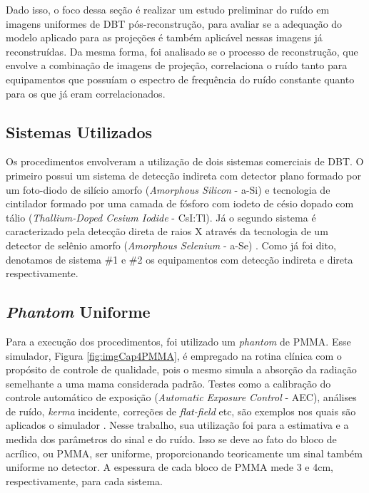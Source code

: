 Dado isso, o foco dessa seção é realizar um estudo preliminar do ruído em imagens uniformes de \acs{DBT} pós-reconstrução, para avaliar se a adequação do modelo aplicado para as projeções é também aplicável nessas imagens já reconstruídas. Da mesma forma, foi analisado se o processo de reconstrução, que envolve a combinação de imagens de projeção, correlaciona o ruído tanto para equipamentos que possuíam o espectro de frequência do ruído constante quanto para os que já eram correlacionados.   

\subsection{Sistemas Utilizados}

Os procedimentos envolveram a utilização de dois sistemas comerciais de \acs{DBT}. O primeiro possui um sistema de detecção indireta com detector plano formado por um foto-diodo de silício amorfo (\textit{Amorphous Silicon} - \acs{a-Si}) e tecnologia de cintilador formado por uma camada de fósforo com iodeto de césio dopado com tálio (\textit{Thallium-Doped Cesium Iodide} - \acs{CsI:Tl}). Já o segundo sistema é caracterizado pela detecção direta de raios X através da tecnologia de um detector de selênio amorfo (\textit{Amorphous Selenium} - \acs{a-Se}) \cite[p. 531]{mcEntee2017handbook}. Como já foi dito, denotamos de sistema \#1 e \#2 os equipamentos com detecção indireta e direta respectivamente.

\subsection{\textit{Phantom} Uniforme}

Para a execução dos procedimentos, foi utilizado um \textit{phantom} de \ac{PMMA}. Esse simulador, Figura \ref{fig:imgCap4PMMA}, é empregado na rotina clínica com o propósito de controle de qualidade, pois o mesmo simula a absorção da radiação semelhante a uma mama considerada padrão. Testes como a calibração do controle automático de exposição (\textit{Automatic Exposure Control} - \acs{AEC}), análises de ruído, \textit{kerma} incidente, correções de \textit{flat-field} etc, são exemplos nos quais são aplicados o simulador \cite{caron2017,vanegen2018protocol}. Nesse trabalho, sua utilização foi para a estimativa e a medida dos parâmetros do sinal e do ruído. Isso se deve ao fato do bloco de acrílico, ou \acs{PMMA}, ser uniforme, proporcionando teoricamente um sinal também uniforme no detector. A espessura de cada bloco de \acs{PMMA} mede 3 e 4cm, respectivamente, para cada sistema.

